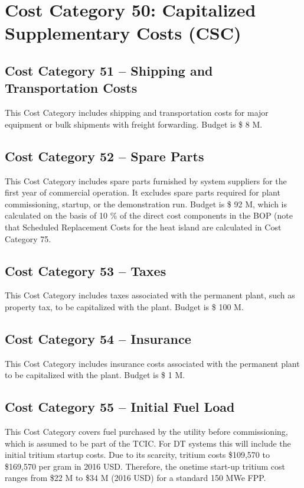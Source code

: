 \section{Cost Category 50: Capitalized Supplementary Costs (CSC)}


\subsection*{Cost Category 51 – Shipping and Transportation Costs}
This Cost Category includes shipping and transportation costs for major equipment or bulk shipments with freight forwarding. Budget is \$ 8 M.

\subsection*{Cost Category 52 – Spare Parts}
This Cost Category includes spare parts furnished by system suppliers for the first year of commercial operation. It excludes spare parts required for plant commissioning, startup, or the demonstration run.  Budget is \$ 92 M, which is calculated on the basis of 10 \% of the direct cost components in the BOP (note that Scheduled Replacement Costs for the heat island are calculated in Cost Category 75.

\subsection*{Cost Category 53 – Taxes}
This Cost Category includes taxes associated with the permanent plant, such as property tax, to be capitalized with the plant. Budget is \$ 100 M.

\subsection*{Cost Category 54 – Insurance}
This Cost Category includes insurance costs associated with the permanent plant to be capitalized with the plant.  Budget is \$ 1 M.

\subsection*{Cost Category 55 – Initial Fuel Load}
This Cost Category covers fuel purchased by the utility before commissioning, which is assumed to be part of the TCIC. For DT systems this will include the initial tritium startup costs.  Due to its scarcity, tritium costs \$109,570 to \$169,570 per gram in 2016 USD. Therefore, the onetime start-up tritium cost ranges from \$22 M to \$34 M (2016 USD) for a standard 150 MWe FPP. \\

